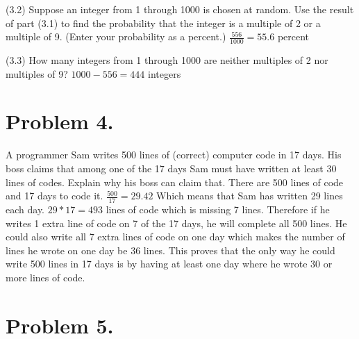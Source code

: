 \documentclass[11pt]{article}
\begin{document}
\noindent
(3.2) Suppose an integer from 1 through 1000 is chosen at random. Use the result of part (3.1) to find the probability that the integer is a multiple of 2 or a multiple of 9. (Enter your probability as a percent.)
\newline
\newline
\newline
$\frac{556}{1000} = 55.6$ percent
\newline
\newline
\newline

\noindent
(3.3) How many integers from 1 through 1000 are neither multiples of 2 nor multiples of 9?
\newline
\newline
$1000 - 556 = 444$ integers
\newline
\newpage

\section*{Problem 4.}

A programmer Sam writes 500 lines of (correct) computer code in 17 days. His
boss claims that among one of the 17 days Sam must have written at least 30
lines of codes. Explain why his boss can claim that.
\newline
\newline
There are 500 lines of code and 17 days to code it. $\frac{500}{17} = 29.42$
\newline
Which means that Sam has written 29 lines each day.
\newline
$29 * 17 = 493$ lines of code which is missing 7 lines.
\newline
\newline
Therefore if he writes 1 extra line of code on 7 of the 17 days, he will complete all 500 lines. 
\newline
\newline
He could also write all 7 extra lines of code on one day which makes the number of lines he wrote on one day be 36 lines. 
\newline
\newline
This proves that the only way he could write 500 lines in 17 days is by having at least one day where he wrote 30 or more lines of code.
\newpage

\section*{Problem 5.}
\end{document}
